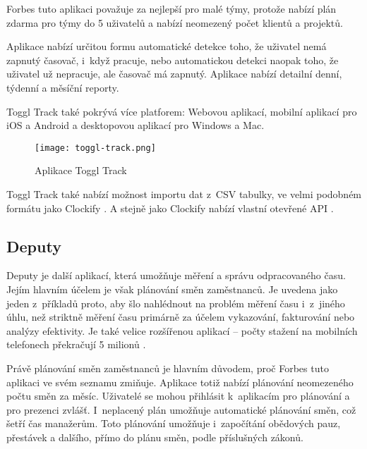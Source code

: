 Forbes tuto aplikaci považuje za nejlepší pro malé týmy, protože nabízí plán zdarma pro týmy do 5 uživatelů a nabízí neomezený počet klientů a projektů. \cite{forbes-tracking-apps-article}

Aplikace nabízí určitou formu automatické detekce toho, že uživatel nemá zapnutý časovač, i~když pracuje, nebo automatickou detekci naopak toho, že uživatel už nepracuje, ale časovač má zapnutý. Aplikace nabízí detailní denní, týdenní a měsíční reporty.

Toggl Track také pokrývá více platforem: Webovou aplikací, mobilní aplikací pro iOS a Android a desktopovou aplikací pro Windows a Mac. \cite{toggl-track}

\begin{figure}[h]
	\centering
	\texttt{[image: toggl-track.png]}
	\caption{Aplikace Toggl Track \cite{toggl-track}}
\end{figure}

Toggl Track také nabízí možnost importu dat z~CSV tabulky, ve velmi podobném formátu jako Clockify \cite{toggl-track-import-csv}. A stejně jako Clockify nabízí vlastní otevřené API \cite{toggl-track-api}.

\subsection{Deputy}\label{deputy}

Deputy je další aplikací, která umožňuje měření a správu odpracovaného času. Jejím hlavním účelem je však plánování směn zaměstnanců. Je uvedena jako jeden z~příkladů proto, aby šlo nahlédnout na problém měření času i~z~jiného úhlu, než striktně měření času primárně za účelem vykazování, fakturování nebo analýzy efektivity. Je také velice rozšířenou aplikací – počty stažení na mobilních telefonech překračují 5 milionů \cite{deputy-app-magic}.

Právě plánování směn zaměstnanců je hlavním důvodem, proč Forbes tuto aplikaci ve svém seznamu zmiňuje. Aplikace totiž nabízí plánování neomezeného počtu směn za měsíc. Uživatelé se mohou přihlásit k~aplikacím pro plánování a pro prezenci zvlášť. I~neplacený plán umožňuje automatické plánování směn, což šetří čas manažerům. Toto plánování umožňuje i~započítání obědových pauz, přestávek a dalšího, přímo do plánu směn, podle příslušných zákonů.  \cite{forbes-tracking-apps-article}


